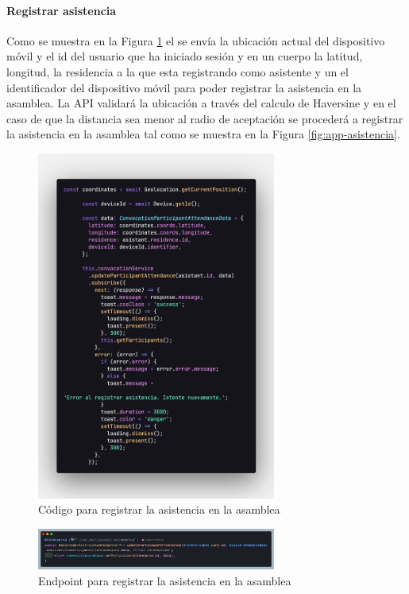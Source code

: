 \paragraph{Registrar asistencia}

Como se muestra en la Figura \ref{fig:app-asistencia-codigo} el se envía la ubicación actual del dispositivo móvil y el id del usuario que ha iniciado sesión y en un cuerpo la latitud, longitud, la residencia a la que esta registrando como asistente y un el identificador del dispositivo móvil para poder registrar la asistencia en la asamblea.
La API validará la ubicación a través del calculo de Haversine y en el caso de que la distancia sea menor al radio de aceptación se procederá a registrar la asistencia en la asamblea tal como se muestra en la Figura \ref{fig:app-asistencia}.

\begin{figure}[H]
    \centering
    \includegraphics[width=0.7\textwidth]{resources/images/app-asistencia-codigo}
    \caption{Código para registrar la asistencia en la asamblea}
    \label{fig:app-asistencia-codigo}
\end{figure}

\begin{figure}[H]
    \centering
    \includegraphics[width=0.7\textwidth]{resources/images/api-asistencia}
    \caption{Endpoint para registrar la asistencia en la asamblea}
    \label{fig:api-asistencia}
\end{figure}

